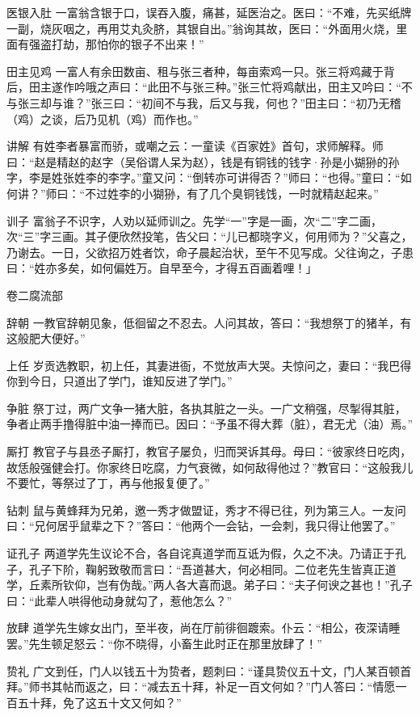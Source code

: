 \documentclass[12pt,UTF8]{ctexbook}
\begin{document}
医银入肚
一富翁含银于口，误吞入腹，痛甚，延医治之。医曰：“不难，先买纸牌一副，烧灰咽之，再用艾丸灸脐，其银自出。”翁询其故，医曰：“外面用火烧，里面有强盗打劫，那怕你的银子不出来！”

田主见鸡
一富人有余田数亩、租与张三者种，每亩索鸡一只。张三将鸡藏于背后，田主遂作吟哦之声曰：“此田不与张三种。”张三忙将鸡献出，田主又吟曰：“不与张三却与谁？”张三曰：“初间不与我，后又与我，何也？”田主曰：“初乃无稽（鸡）之谈，后乃见机（鸡）而作也。”

讲解
有姓李者暴富而骄，或嘲之云：一童读《百家姓》首句，求师解释。师曰：“赵是精赵的赵字（吴俗谓人呆为赵），钱是有铜钱的钱字·孙是小猢狲的孙字，李是姓张姓李的李字。”童又问：“倒转亦可讲得否？”师曰：“也得。”童曰：“如何讲？”师曰：“不过姓李的小猢狲，有了几个臭铜钱饯，一时就精赵起来。”

训子
富翁子不识字，人劝以延师训之。先学“一”字是一画，次“二”字二画，次“三”字三画。其子便欣然投笔，告父曰：“儿已都晓字义，何用师为？”父喜之，乃谢去。一日，父欲招万姓者饮，命子晨起治状，至午不见写成。父往询之，子患曰：“姓亦多矣，如何偏姓万。自早至今，才得五百画着哩！」

卷二腐流部

辞朝
一教官辞朝见象，低徊留之不忍去。人问其故，答曰：“我想祭丁的猪羊，有这般肥大便好。”

上任
岁贡选教职，初上任，其妻进衙，不觉放声大哭。夫惊问之，妻曰：“我巴得你到今日，只道出了学门，谁知反进了学门。”

争脏
祭丁过，两广文争一猪大脏，各执其脏之一头。一广文稍强，尽掣得其脏，争者止两手撸得脏中油一捧而已。因曰：“予虽不得大葬（脏），君无尤（油）焉。”

厮打
教官子与县丞子厮打，教官子屡负，归而哭诉其母。母曰：“彼家终日吃肉，故恁般强健会打。你家终日吃腐，力气衰微，如何敌得他过？”教官曰：“这般我儿不要忙，等祭过了丁，再与他报复便了。”

钻刺
鼠与黄蜂拜为兄弟，邀一秀才做盟证，秀才不得已往，列为第三人。一友问曰：“兄何居乎鼠辈之下？”答曰：“他两个一会钻，一会刺，我只得让他罢了。”

证孔子
两道学先生议论不合，各自诧真道学而互诋为假，久之不决。乃请正于孔子，孔子下阶，鞠躬致敬而言曰：“吾道甚大，何必相同。二位老先生皆真正道学，丘素所钦仰，岂有伪哉。”两人各大喜而退。弟子曰：“夫子何谀之甚也！”孔子曰：“此辈人哄得他动身就勾了，惹他怎么？”

放肆
道学先生嫁女出门，至半夜，尚在厅前徘徊踱索。仆云：“相公，夜深请睡罢。”先生顿足怒云：“你不晓得，小畜生此时正在那里放肆了！”

贽礼
广文到任，门人以钱五十为贽者，题刺曰：“谨具贽仪五十文，门人某百顿首拜。”师书其帖而返之，曰：“减去五十拜，补足一百文何如？”门人答曰：“情愿一百五十拜，免了这五十文又何如？”
\end{document}
